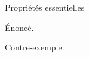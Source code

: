 \documentclass{beamer}
\begin{document}
\begin{slide}{Propriétés essentielles}
  \begin{proposition}Énoncé.\end{proposition}
  \begin{example*}Contre-exemple.\end{example*}
\end{slide}
\end{document}
